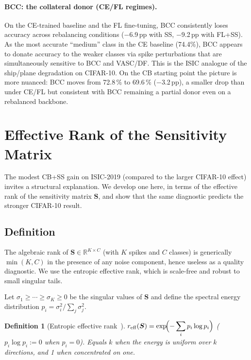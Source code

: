 \documentclass[11pt,a4paper]{article}
\newcommand{\mat}[1]{\bm{#1}}
\newtheorem{definition}{Definition}
\begin{document}
\paragraph{BCC: the collateral donor (CE/FL regimes).}
On the CE-trained baseline and the FL fine-tuning, BCC consistently
loses accuracy across rebalancing conditions ($-$6.9\,pp with SS,
$-$9.2\,pp with FL+SS). As the most accurate ``medium'' class in the
CE baseline (74.4\%), BCC appears to donate accuracy to the weaker
classes via spike perturbations that are simultaneously sensitive to
BCC and VASC/DF. This is the ISIC analogue of the ship/plane
degradation on CIFAR-10. On the CB starting point the picture is more nuanced:
BCC moves from 72.8\,\% to 69.6\,\% ($-$3.2\,pp), a smaller drop
than under CE/FL but consistent with BCC remaining a partial donor
even on a rebalanced backbone.

\section{Effective Rank of the Sensitivity Matrix}
\label{sec:effective-rank}

The modest CB+SS gain on ISIC-2019 (compared to the larger CIFAR-10
effect) invites a structural explanation. We develop one here, in
terms of the effective rank of the sensitivity matrix $\mat{S}$, and
show that the same diagnostic predicts the stronger CIFAR-10 result.

\subsection{Definition}

The algebraic rank of $\mat{S} \in \mathbb{R}^{K \times C}$ (with $K$
spikes and $C$ classes) is generically $\min(K, C)$ in the presence
of any noise component, hence useless as a quality diagnostic. We use
the entropic effective rank, which is scale-free and robust to small
singular tails.

Let $\sigma_1 \geq \cdots \geq \sigma_K \geq 0$ be the singular values
of $\mat{S}$ and define the spectral energy distribution
$p_i = \sigma_i^2 / \sum_j \sigma_j^2$.

\begin{definition}[Entropic effective rank~\cite{roy2007}]
$\displaystyle r_{\mathrm{eff}}(\mat{S}) =
\exp\!\Bigl( - \sum_i p_i \log p_i \Bigr)$
($p_i \log p_i := 0$ when $p_i = 0$). Equals $k$ when the energy is
uniform over $k$ directions, and 1 when concentrated on one.
\end{definition}
\end{document}
